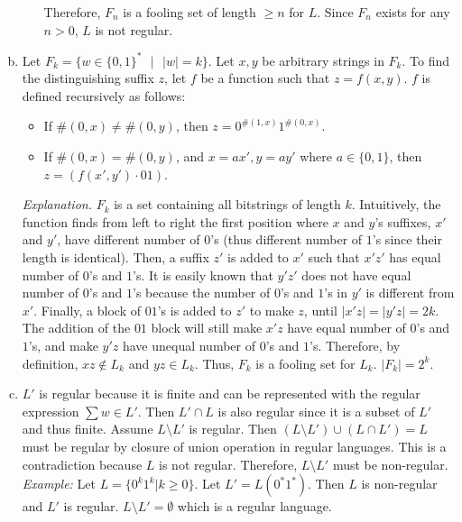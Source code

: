 \documentclass[11pt]{article}
\begin{document}
\begin{solution}
\begin{enumerate}[(a)]
\begin{enumerate}[i.]
\begin{itemize}
\end{itemize}
Therefore, $F_n$ is a fooling set of length $\geq n$ for $L$. Since $F_n$ exists for any $n>0$, $L$ is not regular.
\end{enumerate}
\item
Let $F_k=\{ w\in\{ 0,1 \}^* \text{ } | \text{ } \lvert w \rvert = k \}$. Let $x, y$ be arbitrary strings in $F_k$. To find the distinguishing suffix $z$, let $f$ be a function such that $z=f(x, y)$. $f$ is defined recursively as follows:
\begin{itemize}
\item If $\# (0, x) \neq \# (0, y)$, then $z=0^{\#(1, x)}1^{\#(0, x)}$.
\item If $\# (0, x) = \# (0, y)$, and $x=ax', y=ay'$ where $a\in \{0,1\}$, then $z=(f(x', y')\cdot 01)$.
\end{itemize}
\emph{Explanation.} $F_k$ is a set containing all bitstrings of length $k$. Intuitively, the function finds from left to right the first position where $x$ and $y$'s suffixes, $x'$ and $y'$, have different number of $0$'s (thus different number of $1$'s since their length is identical). Then, a suffix $z'$ is added to $x'$ such that $x'z'$ has equal number of $0$'s and $1$'s. It is easily known that $y'z'$ does not have equal number of $0$'s and $1$'s because the number of $0$'s and $1$'s in $y'$ is different from $x'$. Finally, a block of $01$'s is added to $z'$ to make $z$, until $\lvert x'z \rvert = \lvert y'z \rvert = 2k$. The addition of the $01$ block will still make $x'z$ have equal number of $0$'s and $1$'s, and make $y'z$ have unequal number of $0$'s and $1$'s. Therefore, by definition, $xz\notin L_k$ and $yz\in L_k$. Thus, $F_k$ is a fooling set for $L_k$. $\lvert F_k \rvert = 2^k$.
\item
$L'$ is regular because it is finite and can be represented with the regular expression $\sum{w\in L'}$. Then $L'\cap L$ is also regular since it is a subset of $L'$ and thus finite.
Assume $L\setminus L'$ is regular.
Then $(L\setminus L')\cup (L\cap L')=L$ must be regular by closure of union operation in regular languages.
This is a contradiction because $L$ is not regular. Therefore, $L\setminus L'$ must be non-regular.\\

\emph{Example: }Let $L=\{0^k1^k|k\geq 0\}$. Let $L'=L(0^*1^*)$. Then $L$ is non-regular and $L'$ is regular. $L\setminus L'=\emptyset$ which is a regular language.
\end{enumerate}
\end{solution}
\end{document}
